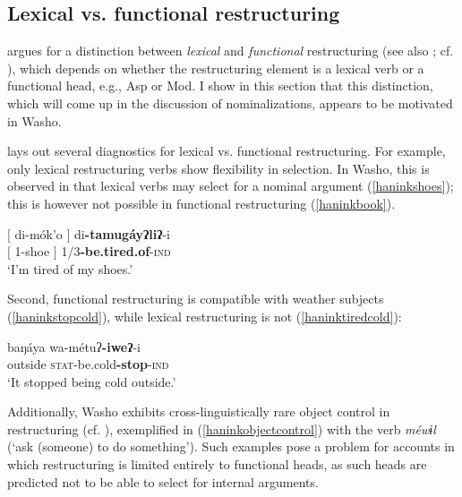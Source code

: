 \documentclass[output=paper]{langscibook}
\begin{document}
\subsection{Lexical vs. functional restructuring} \label{haninksec:vs}
\cite{wurmbrand2001} argues for a distinction between {\itshape lexical} and {\itshape functional} restructuring (see also \citealt{Wurmbrand2004}; cf. \citealt{cinque2001,cinque2004,grano2012diss}), which depends on  whether the restructuring element is a lexical verb or a functional head, e.g., Asp or Mod. I show in this section that this distinction, which will come up in the discussion of nominalizations, appears to be  motivated in Washo. 

\cite{Wurmbrand2004} lays out several diagnostics for lexical vs. functional restructuring. For example, only lexical restructuring verbs show flexibility in selection. In Washo, this is observed in that lexical verbs may select for a nominal argument (\ref{haninkshoes}); this is however not possible in functional restructuring (\ref{haninkbook}).

\ea \gll $[$ di-mók'o $]$ di\textbf{-tamugáyʔliʔ}-i\\
$[$ 1-shoe $]$ 1/3\textbf{-be.tired.of}-{\scshape ind}\\
\glt `I'm tired of my shoes.'\label{haninkshoes}
\z
\z

Second, functional restructuring is compatible with weather subjects (\ref{haninkstopcold}), while lexical restructuring is not (\ref{haninktiredcold}):

\ex baŋáya wa-métuʔ\textbf{-iweʔ}-i\\
outside {\scshape stat}-be.cold{\bfseries -stop}{\scshape -ind}\\
\glt `It stopped being cold outside.'\label{haninkstopcold}
\z
\z

Additionally, Washo exhibits cross-linguistically rare object control in restructuring (cf. \citealt{cinque2001}), exemplified in (\ref{haninkobjectcontrol}) with the verb {\itshape méwɨl} (`ask (someone) to do something'). Such examples pose a problem for accounts in which restructuring is limited entirely to functional heads, as such heads are predicted not to be able to select for internal arguments.
\end{document}
